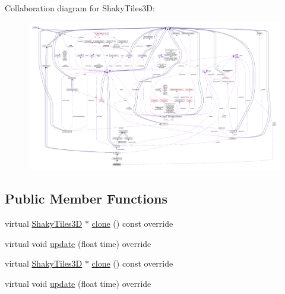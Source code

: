 Collaboration diagram for Shaky\+Tiles3D\+:
\nopagebreak
\begin{figure}[H]
\begin{center}
\leavevmode
\includegraphics[width=350pt]{classShakyTiles3D__coll__graph}
\end{center}
\end{figure}
\subsection*{Public Member Functions}
\begin{DoxyCompactItemize}
\item 
virtual \hyperlink{classShakyTiles3D}{Shaky\+Tiles3D} $\ast$ \hyperlink{classShakyTiles3D_ad83d154be5494000eb8fcfe657e503ff}{clone} () const override
\item 
virtual void \hyperlink{classShakyTiles3D_ac500b90b3a13015c8319799950e4de44}{update} (float time) override
\item 
virtual \hyperlink{classShakyTiles3D}{Shaky\+Tiles3D} $\ast$ \hyperlink{classShakyTiles3D_aefe37a5cda9d6898ad9c573e5a220ce1}{clone} () const override
\item 
virtual void \hyperlink{classShakyTiles3D_aacc8c7fe8c72943ff116ba47e65712ad}{update} (float time) override
\end{DoxyCompactItemize}
